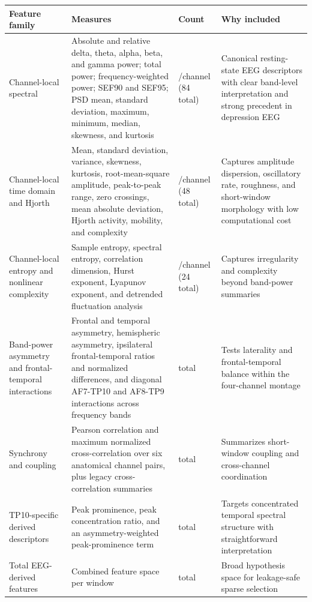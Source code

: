 \begin{tabularx}{\textwidth}{>{\raggedright\arraybackslash}p{}>{\raggedright\arraybackslash}X>{\raggedleft\arraybackslash}p{}>{\raggedright\arraybackslash}p{}}
\toprule
Feature family & Measures & Count & Why included \\
\midrule
Channel-local spectral & Absolute and relative delta, theta, alpha, beta, and gamma power; total power; frequency-weighted power; SEF90 and SEF95; PSD mean, standard deviation, maximum, minimum, median, skewness, and kurtosis & 21/channel (84 total) & Canonical resting-state EEG descriptors with clear band-level interpretation and strong precedent in depression EEG \\
Channel-local time domain and Hjorth & Mean, standard deviation, variance, skewness, kurtosis, root-mean-square amplitude, peak-to-peak range, zero crossings, mean absolute deviation, Hjorth activity, mobility, and complexity & 12/channel (48 total) & Captures amplitude dispersion, oscillatory rate, roughness, and short-window morphology with low computational cost \\
Channel-local entropy and nonlinear complexity & Sample entropy, spectral entropy, correlation dimension, Hurst exponent, Lyapunov exponent, and detrended fluctuation analysis & 6/channel (24 total) & Captures irregularity and complexity beyond band-power summaries \\
Band-power asymmetry and frontal-temporal interactions & Frontal and temporal asymmetry, hemispheric asymmetry, ipsilateral frontal-temporal ratios and normalized differences, and diagonal AF7-TP10 and AF8-TP9 interactions across frequency bands & 70 total & Tests laterality and frontal-temporal balance within the four-channel montage \\
Synchrony and coupling & Pearson correlation and maximum normalized cross-correlation over six anatomical channel pairs, plus legacy cross-correlation summaries & 18 total & Summarizes short-window coupling and cross-channel coordination \\
TP10-specific derived descriptors & Peak prominence, peak concentration ratio, and an asymmetry-weighted peak-prominence term & 3 total & Targets concentrated temporal spectral structure with straightforward interpretation \\
\midrule
Total EEG-derived features & Combined feature space per window & 247 total & Broad hypothesis space for leakage-safe sparse selection \\
\bottomrule
\end{tabularx}
